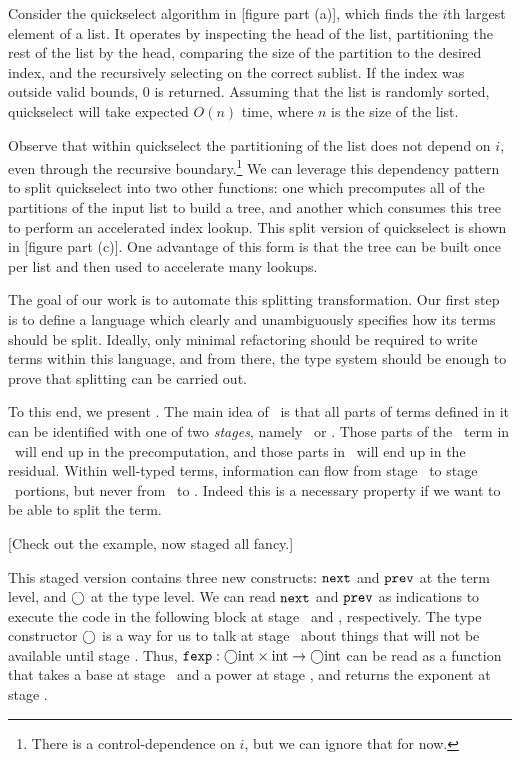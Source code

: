 Consider the quickselect algorithm in [figure part (a)],
which finds the $i$th largest element of a list.
It operates by inspecting the head of the list, 
partitioning the rest of the list by the head,
comparing the size of the partition to the desired index,
and the recursively selecting on the correct sublist.
If the index was outside valid bounds, 0 is returned.
Assuming that the list is randomly sorted, 
quickselect will take expected $O(n)$ time, where $n$ is the size of the list.

Observe that within quickselect the partitioning of the list does not depend on $i$, 
even through the recursive boundary.\footnote{There is a control-dependence on $i$, but we can ignore that for now.}
We can leverage this dependency pattern to split quickselect into two other functions:
one which precomputes all of the partitions of the input list to build a tree,
and another which consumes this tree to perform an accelerated index lookup.
This split version of quickselect is shown in [figure part (c)].
One advantage of this form is that the tree can be built once per list
and then used to accelerate many lookups.

The goal of our work is to automate this splitting transformation.
Our first step is to define a language which clearly and unambiguously specifies how its terms should be split.
Ideally, only minimal refactoring should be required to write terms within this language,
and from there, the type system should be enough to prove that splitting can be carried out.

To this end, we present \lang.
The main idea of \lang\ is that all parts of terms defined in it can be identified with one of two {\em stages}, namely \bbone\ or \bbtwo.
Those parts of the \lang\ term in \bbone\ will end up in the precomputation, 
and those parts in \bbtwo\ will end up in the residual.
Within well-typed terms, information can flow from stage \bbone\ to stage \bbtwo\ portions,
but never from \bbtwo\ to \bbone.  
Indeed this is a necessary property if we want to be able to split the term.

[Check out the example, now staged all fancy.]

This staged version contains three new constructs: 
${\tt next}$ and ${\tt prev}$ at the term level, and $\bigcirc$ at the type level.
We can read ${\tt next}$ and ${\tt prev}$ as indications to 
execute the code in the following block at stage \bbtwo\ and \bbone, respectively.
The type constructor $\bigcirc$ is a way for us to talk at stage \bbone\ about things that will not be available until stage \bbtwo.
Thus, ${\tt fexp} : \bigcirc{\rm int} \times {\rm int} \to \bigcirc{\rm int}$ 
can be read as a function that takes a base at stage \bbtwo\ and a power at stage \bbone, 
and returns the exponent at stage \bbtwo.

